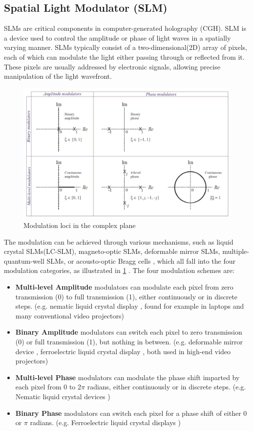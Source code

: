 \subsection{Spatial Light Modulator (SLM)} \label{sec:SLM}
SLMs are critical components in computer-generated holography (CGH). SLM is a device used to control the amplitude or phase of light waves in a spatially varying manner. SLMs typically consist of a two-dimensional(2D) array of pixels, each of which can modulate the light either passing through or reflected from it. These pixels are usually addressed by electronic signals, allowing precise manipulation of the light wavefront.
\begin{figure}[H]
  \centering
  \includegraphics[width=1.0\textwidth]{modulation_loci.jpg}
  \caption{Modulation loci in the complex plane \cite{Cable2006}} \label{fig:modulation_loci}
\end{figure}
The modulation can be achieved through various mechanisms, such as liquid crystal SLMs(LC-SLM), magneto-optic SLMs, deformable mirror SLMs, multiple-quantum-well SLMs, or acousto-optic Bragg cells \cite{Goodman2017}, which all fall into the four modulation categories, as illustrated in \cref{fig:modulation_loci} \cite{Cable2006}. The four modulation schemes are:
\begin{itemize}
  \item \textbf{Multi-level Amplitude} modulators can modulate each pixel from zero transmission (0) to full transmission (1), either continuously or in discrete steps. (e.g. nematic liquid crystal display \cite{Schadt1971}, found for example in laptops and many conventional video projectors)
  \item \textbf{Binary Amplitude} modulators can switch each pixel to zero transmission (0) or full transmission (1), but nothing in between. (e.g. deformable mirror device \cite{Pape1983}, ferroelectric liquid crystal display \cite{Johnson1993}, both used in high-end video projectors)
  \item \textbf{Multi-level Phase} modulators can modulate the phase shift imparted by each pixel from 0 to 2$\pi$ radians, either continuously or in discrete steps. (e.g. Nematic liquid crystal devices \cite{Lee2004})
  \item \textbf{Binary Phase} modulators can switch each pixel for a phase shift of either 0 or $\pi$ radians. (e.g. Ferroelectric liquid crystal displays \cite{Broomfield1992})
\end{itemize}

